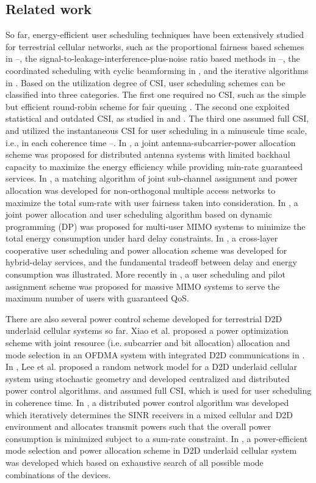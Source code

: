 \documentclass{ieeeaccess}
\begin{document}
\subsection{Related work}
So far, energy-efficient user scheduling techniques have been extensively studied for terrestrial cellular networks, such as the proportional fairness based schemes in \cite{p61}--\cite{p63}, the signal-to-leakage-interference-plus-noise ratio based methods in \cite{p64}--\cite{p66}, the coordinated scheduling with cyclic beamforming in \cite{p67}\cite{p68}, and the iterative algorithms in \cite{p69}\cite{p70}. Based on the utilization degree of CSI, user scheduling schemes can be classified into three categories. The first one required no CSI, such as the simple but efficient round-robin scheme for fair queuing \cite{p51}. The second one exploited statistical and outdated CSI, as studied in \cite{p52} and \cite{p53}. The third one assumed full CSI, and utilized the instantaneous CSI for user scheduling in a minuscule time scale, i.e., in each coherence time \cite{p3}--\cite{p7}. In \cite{p3}, a joint antenna-subcarrier-power allocation scheme was proposed for distributed antenna systems with limited backhaul capacity to maximize the energy efficiency while providing min-rate guaranteed services. In \cite{p6}, a matching algorithm of joint sub-channel assignment and power allocation was developed for non-orthogonal multiple access networks to maximize the total sum-rate with user fairness taken into consideration. In \cite{p4}, a joint power allocation and user scheduling algorithm based on dynamic programming (DP) was proposed for multi-user MIMO systems to minimize the total energy consumption under hard delay constraints. In \cite{p5}, a cross-layer cooperative user scheduling and power allocation scheme was developed for hybrid-delay services, and the fundamental tradeoff between delay and energy consumption was illustrated. More recently in \cite{p7}, a user scheduling and pilot assignment scheme was proposed for massive MIMO systems to serve the maximum number of users with guaranteed QoS.

There are also several power control scheme developed for terrestrial D2D underlaid cellular systems so far. Xiao et al. proposed a power optimization scheme with joint resource (i.e. subcarrier and bit allocation) allocation and mode selection in an OFDMA system with integrated D2D communications in \cite{p801}. In \cite{p802}, Lee et al. proposed a random network model for a D2D underlaid cellular system using stochastic geometry and developed centralized and distributed power control algorithms. \cite{p801} and \cite{p802} assumed full CSI, which is used for user scheduling in coherence time. In \cite{p803}, a distributed power control algorithm was developed which iteratively determines the SINR receivers in a mixed cellular and D2D environment and allocates transmit powers such that the overall power consumption is minimized subject to a sum-rate constraint. In \cite{p804}, a power-efficient mode selection and power allocation scheme in D2D underlaid cellular system was developed which based on exhaustive search of all possible mode combinations of the devices.  
\end{document}
